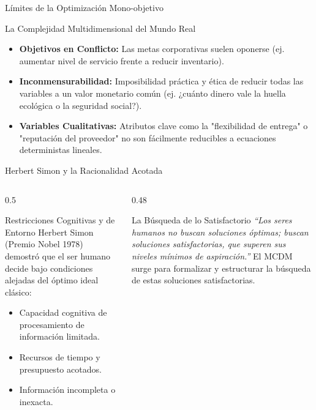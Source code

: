 \documentclass[aspectratio=169, 10pt]{beamer}
\begin{document}
\begin{frame}{Límites de la Optimización Mono-objetivo}
    \begin{alertblock}{La Complejidad Multidimensional del Mundo Real}
        \begin{itemize}
            \item \textbf{Objetivos en Conflicto:} Las metas corporativas suelen oponerse (ej. aumentar nivel de servicio frente a reducir inventario).
            \item \textbf{Inconmensurabilidad:} Imposibilidad práctica y ética de reducir todas las variables a un valor monetario común (ej. ¿cuánto dinero vale la huella ecológica o la seguridad social?).
            \item \textbf{Variables Cualitativas:} Atributos clave como la "flexibilidad de entrega" o "reputación del proveedor" no son fácilmente reducibles a ecuaciones deterministas lineales.
        \end{itemize}
    \end{alertblock}
\end{frame}

\begin{frame}{Herbert Simon y la Racionalidad Acotada}
    \begin{columns}
        \begin{column}{0.5\textwidth}
            \begin{block}{Restricciones Cognitivas y de Entorno}
                Herbert Simon (Premio Nobel 1978) demostró que el ser humano decide bajo condiciones alejadas del óptimo ideal clásico:
                \begin{itemize}
                    \item Capacidad cognitiva de procesamiento de información limitada.
                    \item Recursos de tiempo y presupuesto acotados.
                    \item Información incompleta o inexacta.
                \end{itemize}
            \end{block}
        \end{column}
        
        \begin{column}{0.48\textwidth}
            \begin{exampleblock}{La Búsqueda de lo Satisfactorio}
                {\itshape ``Los seres humanos no buscan soluciones óptimas; buscan soluciones satisfactorias, que superen sus niveles mínimos de aspiración.''}
                \vskip 5pt
                El MCDM surge para formalizar y estructurar la búsqueda de estas soluciones satisfactorias.
            \end{exampleblock}
        \end{column}
    \end{columns}
\end{frame}
\end{document}
